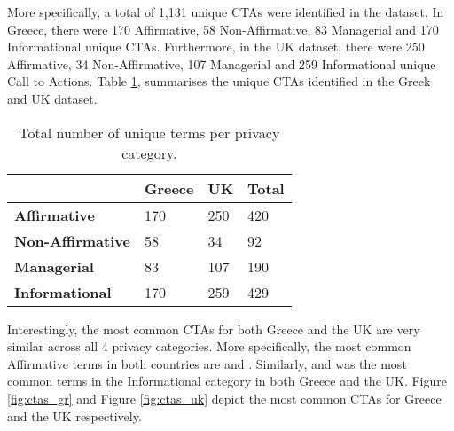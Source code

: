 \documentclass[../main.tex]{subfiles}
\begin{document}
More specifically, a total of 1,131 unique CTAs were identified in the dataset. In Greece, there were 170 Affirmative, 58 Non-Affirmative, 83 Managerial and 170 Informational unique CTAs. Furthermore, in the UK dataset, there were 250 Affirmative, 34 Non-Affirmative, 107 Managerial and 259 Informational unique Call to Actions. Table \ref{tab:unique_ctas}, summarises the unique CTAs identified in the Greek and UK dataset. 

\begin{table}[ht]
    \centering
    \begin{tabular}{@{}llll@{}}
        \toprule
                                 & \textbf{Greece} & \textbf{UK} & \textbf{Total} \\ \midrule
        \textbf{Affirmative}     & 170             & 250         & 420            \\
        \textbf{Non-Affirmative} & 58              & 34          & 92             \\
        \textbf{Managerial}      & 83              & 107         & 190            \\
        \textbf{Informational}   & 170             & 259         & 429            \\ \bottomrule
    \end{tabular}
    \caption{Total number of unique terms per privacy category.}
    \label{tab:unique_ctas}
\end{table}

Interestingly, the most common CTAs for both Greece and the UK are very similar across all 4 privacy categories. More specifically, the most common Affirmative terms in both countries are  and . Similarly,  and  was the most common terms in the Informational category in both Greece and the UK. Figure \ref{fig:ctas_gr} and Figure \ref{fig:ctas_uk} depict the most common CTAs for Greece and the UK respectively.

\grAffirmativeCtas
\end{document}
